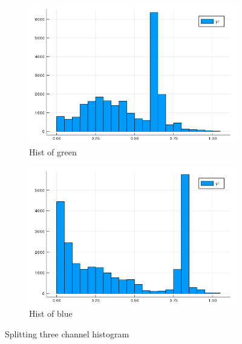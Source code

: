 \documentclass{beamer}
\begin{document}
\begin{frame}
\begin{figure}[htb]
\begin{subfigure}[b]{0.24\linewidth}
    \end{subfigure}
    \begin{subfigure}[b]{0.24\linewidth}
      \includegraphics[width=\linewidth]{images/hist_g.png}
      \caption{Hist of green}
    \end{subfigure}
    \begin{subfigure}[b]{0.24\linewidth}
      \includegraphics[width=\linewidth]{images/hist_b.png}
      \caption{Hist of blue}
    \end{subfigure}
    \caption{Splitting three channel histogram}
    \label{fig:hist_g_rgb}
  \end{figure}  

\end{frame}
\end{document}
